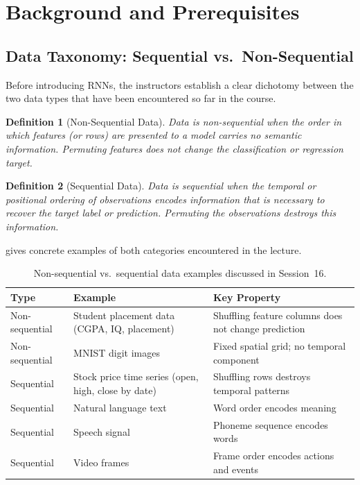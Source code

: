 \documentclass[12pt,a4paper]{article}
\newtheorem{definition}{Definition}[section]
\begin{document}
\section{Background and Prerequisites}
\label{sec:background}

\subsection{Data Taxonomy: Sequential vs.\ Non-Sequential}
\label{subsec:data_taxonomy}

Before introducing RNNs, the instructors establish a clear dichotomy between
the two data types that have been encountered so far in the course.

\begin{definition}[Non-Sequential Data]
\label{def:nonseq}
Data is \emph{non-sequential} when the order in which features (or rows) are
presented to a model carries no semantic information.  Permuting features
does not change the classification or regression target.
\end{definition}

\begin{definition}[Sequential Data]
\label{def:seq}
Data is \emph{sequential} when the temporal or positional ordering of
observations encodes information that is necessary to recover the target
label or prediction.  Permuting the observations destroys this information.
\end{definition}

 gives concrete examples of both categories encountered
in the lecture.

\begin{table}[ht]
  \centering
  \caption{Non-sequential vs.\ sequential data examples discussed in Session~16.}
  \label{tab:data_types}
  \begin{tabularx}{\linewidth}{lXX}
    \toprule
    \textbf{Type} & \textbf{Example} & \textbf{Key Property} \\
    \midrule
    Non-sequential & Student placement data (CGPA, IQ, placement) &
      Shuffling feature columns does not change prediction \\
    Non-sequential & MNIST digit images &
      Fixed spatial grid; no temporal component \\
    Sequential & Stock price time series (open, high, close by date) &
      Shuffling rows destroys temporal patterns \\
    Sequential & Natural language text &
      Word order encodes meaning \\
    Sequential & Speech signal &
      Phoneme sequence encodes words \\
    Sequential & Video frames &
      Frame order encodes actions and events \\
    \bottomrule
  \end{tabularx}
\end{table}
\end{document}
